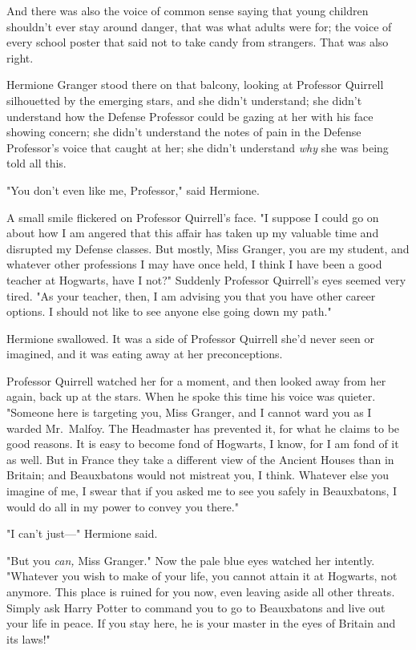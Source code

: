 And there was also the voice of common sense saying that young children 
shouldn't ever stay around danger, that was what adults were for; the voice of 
every school poster that said not to take candy from strangers. That was also 
right.

Hermione Granger stood there on that balcony, looking at Professor Quirrell 
silhouetted by the emerging stars, and she didn't understand; she didn't 
understand how the Defense Professor could be gazing at her with his face 
showing concern; she didn't understand the notes of pain in the Defense 
Professor's voice that caught at her; she didn't understand \emph{why} she was 
being told all this.

"You don't even like me, Professor," said Hermione.

A small smile flickered on Professor Quirrell's face. "I suppose I could go on 
about how I am angered that this affair has taken up my valuable time and 
disrupted my Defense classes. But mostly, Miss Granger, you are my student, and 
whatever other professions I may have once held, I think I have been a good 
teacher at Hogwarts, have I not?" Suddenly Professor Quirrell's eyes seemed 
very tired. "As your teacher, then, I am advising you that you have other 
career options. I should not like to see anyone else going down my path."

Hermione swallowed. It was a side of Professor Quirrell she'd never seen or 
imagined, and it was eating away at her preconceptions.

Professor Quirrell watched her for a moment, and then looked away from her 
again, back up at the stars. When he spoke this time his voice was quieter. 
"Someone here is targeting you, Miss Granger, and I cannot ward you as I warded 
Mr.~Malfoy. The Headmaster has prevented it, for what he claims to be good 
reasons. It is easy to become fond of Hogwarts, I know, for I am fond of it as 
well. But in France they take a different view of the Ancient Houses than in 
Britain; and Beauxbatons would not mistreat you, I think. Whatever else you 
imagine of me, I swear that if you asked me to see you safely in Beauxbatons, I 
would do all in my power to convey you there."

"I can't just---" Hermione said.

"But you \emph{can,} Miss Granger." Now the pale blue eyes watched her 
intently. "Whatever you wish to make of your life, you cannot attain it at 
Hogwarts, not anymore. This place is ruined for you now, even leaving aside all 
other threats. Simply ask Harry Potter to command you to go to Beauxbatons and 
live out your life in peace. If you stay here, he is your master in the eyes of 
Britain and its laws!"

